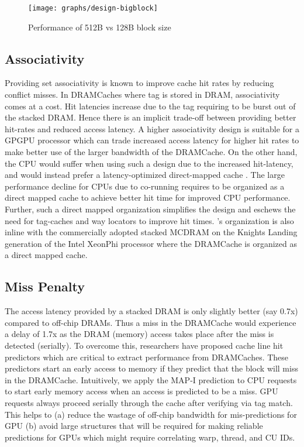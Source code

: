 \begin{figure}[htbp]
   \centering
   \texttt{[image: graphs/design-bigblock]}
   \caption{Performance of 512B vs 128B block size}	
   \label{fig:design-bigblock}
\end{figure}

\subsection{Associativity} 
Providing set associativity is known to improve cache hit rates by reducing conflict misses. In DRAMCaches where tag is stored in DRAM,  associativity comes at a cost. Hit latencies increase due to the tag requiring to be burst out of the stacked DRAM. Hence there is an implicit trade-off between providing better hit-rates and reduced access latency. A higher associativity design is suitable for a GPGPU processor which can trade increased access latency for higher hit rates to make better use of the larger bandwidth of the DRAMCache. On the other hand, the CPU would suffer when using such a design due to the increased hit-latency, and  would instead prefer a latency-optimized direct-mapped cache \cite{alloy}.
The large performance decline for CPUs due to co-running requires \cachename to be organized as a direct mapped cache to achieve better hit time for improved CPU performance. 
Further, such a direct mapped organization simplifies the design and eschews the need for tag-caches \cite{atcache} and way locators \cite{bimodal} to improve hit times. \cachename's organization is also inline with the commercially adopted stacked MCDRAM on the Knights Landing generation of the Intel XeonPhi processor \cite{xeonphi} where the DRAMCache is organized as a direct mapped cache.

\subsection{Miss Penalty}
The access latency provided by a stacked DRAM is only slightly better (say 0.7x) compared to off-chip DRAMs. Thus a miss in the DRAMCache would experience a delay of 1.7x as the DRAM (memory) access takes place after the miss is detected (serially). To overcome this, researchers have proposed cache line hit predictors \cite{loh-hill,alloy} which are critical to extract performance from DRAMCaches. These predictors start an early access to memory if they predict that the block will miss in the DRAMCache. Intuitively, we apply the MAP-I prediction \cite{alloy} to CPU requests to start early memory access when an access is predicted to be a miss. GPU requests always proceed serially through the cache after verifying via tag match. This helps to (a) reduce the wastage of off-chip bandwidth for mis-predictions for GPU (b) avoid large structures that will be required for making reliable predictions for GPUs which might require correlating warp, thread, and CU IDs.

